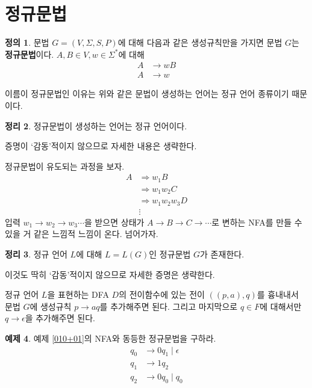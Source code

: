 \documentclass[b5paper, 10pt]{book}
\theoremstyle{definition}
\newtheorem{defn}{정의}[chapter]
\newtheorem{thm}[defn]{정리}
\newtheorem{ex}[defn]{예제}
\newenvironment{pf*}{\pushQED{\qed}\pf}{\popQED\endpf}
\begin{document}
\section{정규문법}
\begin{defn} 
문법 $G = (V, \Sigma, S, P)$에 대해 다음과 같은 생성규칙만을 가지면 문법 
$G$는 \textbf{정규문법}이다. $A,B \in V, w \in \Sigma^{*}$에 대해 
\begin{align*}
    A &\rightarrow wB \\ 
    A &\rightarrow w
\end{align*}
\end{defn}
이름이 정규문법인 이유는 위와 같은 문법이 생성하는 언어는 정규 언어 종류이기 때문이다.
\begin{thm}
정규문법이 생성하는 언어는 정규 언어이다.
\end{thm}
\begin{pf*}
증명이 `감동'적이지 않으므로 자세한 내용은 생략한다.

정규문법이 유도되는 과정을 보자. 
\begin{align*}
    A &\Rightarrow w_1 B \\ 
    & \Rightarrow w_1w_2 C \\ 
    & \Rightarrow w_1w_2w_3 D \\ 
    & \vdots
\end{align*}
입력 $w_1\rightarrow w_2 \rightarrow w_3 \cdots$을 받으면 
상태가 $A \rightarrow B \rightarrow C \rightarrow \cdots$로 변하는 NFA를
만들 수 있을 거 같은 느낌적 느낌이 온다. 넘어가자.
\end{pf*}
\begin{thm}
    정규 언어 $L$에 대해 $L = L(G)$인 정규문법 $G$가 존재한다. 
\end{thm}
\begin{pf*}
    이것도 딱히 `감동'적이지 않으므로 자세한 증명은 생략한다. 
    
    정규 언어 $L$을 표현하는 DFA $D$의 전이함수에 있는 전이
    $((p, a), q)$를 흉내내서 문법 $G$에 생성규칙 $p \rightarrow aq$를 추가해주면 된다.
    그리고 마지막으로 $q \in F$에 대해서만 $q \rightarrow \epsilon$을 추가해주면 된다.
\end{pf*}
\begin{ex}
    예제 \ref{010+01}의 NFA와 동등한 정규문법을 구하라. 
    \begin{align*}
        q_0 & \rightarrow 0q_1 \; \vert \; \epsilon \\ 
        q_1 & \rightarrow 1q_2 \\ 
        q_2 & \rightarrow 0q_0 \; \vert \; q_0
    \end{align*}
\end{ex}
\end{document}
